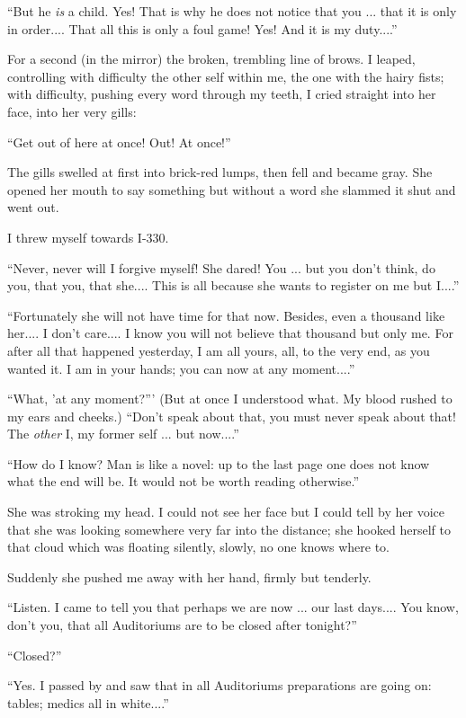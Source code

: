 \documentclass[11pt,openany]{book}
\begin{document}
``But he \emph{is} a child. Yes! That is why he does not notice that you ... that it is only in order.... That all this is only a foul game! Yes! And it is my duty....''

For a second (in the mirror) the broken, trembling line of brows. I leaped, controlling with difficulty the other self within me, the one with the hairy fists; with difficulty, pushing every word through my teeth, I cried straight into her face, into her very gills:

``Get out of here at once! Out! At once!''

The gills swelled at first into brick-red lumps, then fell and became gray. She opened her mouth to say something but without a word she slammed it shut and went out.

I threw myself towards I-330.

``Never, never will I forgive myself! She dared! You ... but you don't think, do you, that you, that she.... This is all because she wants to register on me but I....''

``Fortunately she will not have time for that now. Besides, even a thousand like her.... I don't care.... I know you will not believe that thousand but only me. For after all that happened yesterday, I am all yours, all, to the very end, as you wanted it. I am in your hands; you can now at any moment....''

``What, 'at any moment?''' (But at once I understood what. My blood rushed to my ears and cheeks.) ``Don't speak about that, you must never speak about that! The \emph{other} I, my former self ... but now....''

``How do I know? Man is like a novel: up to the last page one does not know what the end will be. It would not be worth reading otherwise.''

She was stroking my head. I could not see her face but I could tell by her voice that she was looking somewhere very far into the distance; she hooked herself to that cloud which was floating silently, slowly, no one knows where to.

Suddenly she pushed me away with her hand, firmly but tenderly.

``Listen. I came to tell you that perhaps we are now ... our last days.... You know, don't you, that all Auditoriums are to be closed after tonight?''

``Closed?''

``Yes. I passed by and saw that in all Auditoriums preparations are going on: tables; medics all in white....''
\end{document}
